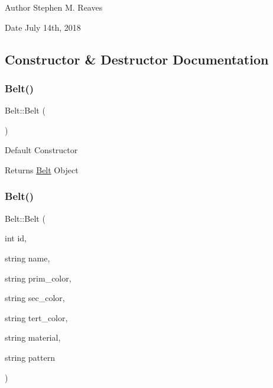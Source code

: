 \begin{DoxyAuthor}{Author}
Stephen M. Reaves 
\end{DoxyAuthor}
\begin{DoxyDate}{Date}
July 14th, 2018 
\end{DoxyDate}


\subsection{Constructor \& Destructor Documentation}
\mbox{\label{classBelt_a6dc40c21b5a62c71925df189511d7551}} 
\subsubsection{\texorpdfstring{Belt()}{Belt()}\hspace{0.1cm}{\footnotesize\ttfamily [1/2]}}
{\footnotesize\ttfamily Belt\+::\+Belt (\begin{DoxyParamCaption}{ }\end{DoxyParamCaption})}

Default Constructor

\begin{DoxyReturn}{Returns}
\mbox{\hyperlink{classBelt}{Belt}} Object 
\end{DoxyReturn}
\mbox{\label{classBelt_a2a8b481a0fe80916513dbd5cf1f03127}} 
\subsubsection{\texorpdfstring{Belt()}{Belt()}\hspace{0.1cm}{\footnotesize\ttfamily [2/2]}}
{\footnotesize\ttfamily Belt\+::\+Belt (\begin{DoxyParamCaption}\item[{int}]{id,  }\item[{string}]{name,  }\item[{string}]{prim\+\_\+color,  }\item[{string}]{sec\+\_\+color,  }\item[{string}]{tert\+\_\+color,  }\item[{string}]{material,  }\item[{string}]{pattern }\end{DoxyParamCaption})}

